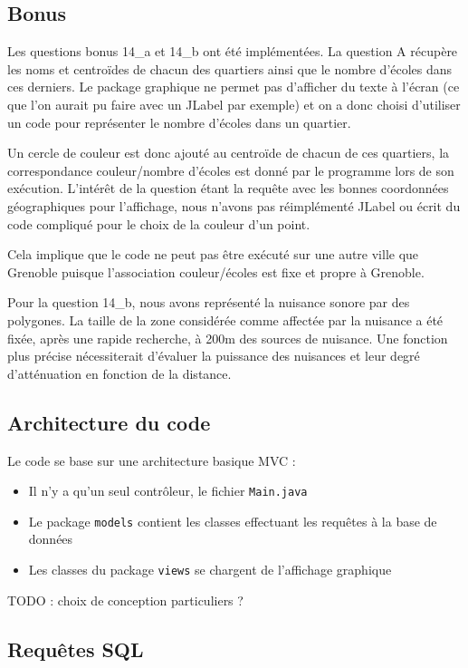 \documentclass[12pt,a4paper]{article}
\begin{document}
\subsection{Bonus}

Les questions bonus 14\_a et 14\_b ont été implémentées. La question A récupère les noms et centroïdes de chacun des quartiers ainsi que le nombre d'écoles dans ces derniers. Le package graphique ne permet pas d'afficher du texte à l'écran (ce que l'on aurait pu faire avec un JLabel par exemple) et on a donc choisi d'utiliser un code pour représenter le nombre d'écoles dans un quartier.

Un cercle de couleur est donc ajouté au centroïde de chacun de ces quartiers, la correspondance couleur/nombre d'écoles est donné par le programme lors de son exécution.
L'intérêt de la question étant la requête avec les bonnes coordonnées géographiques pour l'affichage, nous n'avons pas réimplémenté JLabel ou écrit du code compliqué pour le choix de la couleur d'un point.

Cela implique que le code ne peut pas être exécuté sur une autre ville que Grenoble puisque l'association couleur/écoles est fixe et propre à Grenoble.

Pour la question 14\_b, nous avons représenté la nuisance sonore par des polygones. La taille de la zone considérée comme affectée par la nuisance a été fixée, après une rapide recherche, à 200m des sources de nuisance. Une fonction plus précise nécessiterait d'évaluer la puissance des nuisances et leur degré d'atténuation en fonction de la distance.

\subsection*{Architecture du code}

Le code se base sur une architecture basique MVC :

\begin{itemize}
\item Il n'y a qu'un seul contrôleur, le fichier \verb?Main.java?
\item Le package \verb?models? contient les classes effectuant les requêtes à la base de données \item Les classes du package \verb?views? se chargent de l'affichage graphique
\end{itemize}

TODO : choix de conception particuliers ?

\subsection*{Requêtes SQL}
\end{document}

